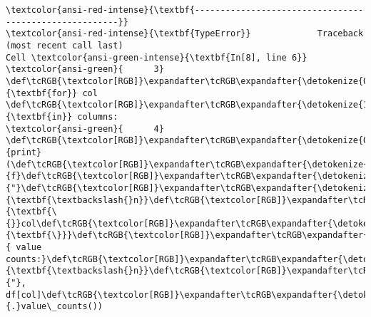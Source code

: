\documentclass[11pt]{article}
\begin{document}
    \begin{Verbatim}[commandchars=\\\{\}, frame=single, framerule=2mm, rulecolor=\color{outerrorbackground}]
\textcolor{ansi-red-intense}{\textbf{-------------------------------------------------------}}
\textcolor{ansi-red-intense}{\textbf{TypeError}}             Traceback (most recent call last)
Cell \textcolor{ansi-green-intense}{\textbf{In[8], line 6}}
\textcolor{ansi-green}{      3} \def\tcRGB{\textcolor[RGB]}\expandafter\tcRGB\expandafter{\detokenize{0,135,0}}{\textbf{for}} col \def\tcRGB{\textcolor[RGB]}\expandafter\tcRGB\expandafter{\detokenize{175,0,255}}{\textbf{in}} columns:
\textcolor{ansi-green}{      4}     \def\tcRGB{\textcolor[RGB]}\expandafter\tcRGB\expandafter{\detokenize{0,135,0}}{print}(\def\tcRGB{\textcolor[RGB]}\expandafter\tcRGB\expandafter{\detokenize{175,0,0}}{f}\def\tcRGB{\textcolor[RGB]}\expandafter\tcRGB\expandafter{\detokenize{175,0,0}}{"}\def\tcRGB{\textcolor[RGB]}\expandafter\tcRGB\expandafter{\detokenize{175,95,0}}{\textbf{\textbackslash{}n}}\def\tcRGB{\textcolor[RGB]}\expandafter\tcRGB\expandafter{\detokenize{175,95,135}}{\textbf{\{}}col\def\tcRGB{\textcolor[RGB]}\expandafter\tcRGB\expandafter{\detokenize{175,95,135}}{\textbf{\}}}\def\tcRGB{\textcolor[RGB]}\expandafter\tcRGB\expandafter{\detokenize{175,0,0}}{ value counts:}\def\tcRGB{\textcolor[RGB]}\expandafter\tcRGB\expandafter{\detokenize{175,95,0}}{\textbf{\textbackslash{}n}}\def\tcRGB{\textcolor[RGB]}\expandafter\tcRGB\expandafter{\detokenize{175,0,0}}{"}, df[col]\def\tcRGB{\textcolor[RGB]}\expandafter\tcRGB\expandafter{\detokenize{98,98,98}}{.}value\_counts())

\end{Verbatim}
\end{document}
